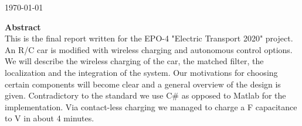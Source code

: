 \documentclass[12pt]{scrreprt}
\begin{document}
\begin{titlepage}


{\large \today}\\ [1.5cm]


 
% 
\vspace{3cm} %

\textbf{Abstract} \\ 
This is the final report written for the EPO-4 "Electric Transport 2020" project. 
An R/C car is modified with wireless charging and autonomous control options. 
We will describe the wireless charging of the car, the matched filter, the localization and the integration of the system. %
Our motivations for choosing certain components will become clear and a general overview of the design is given. 
Contradictory to the standard we use C\# as opposed to Matlab for the implementation. 
Via contact-less charging we managed to charge a \unit[35]{F} capacitance to \unit[20]{V} in about 4 minutes. 


\vfill %

\end{titlepage}
\end{document}
